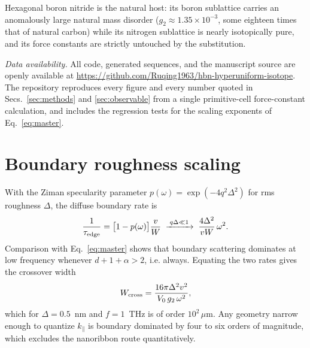 \documentclass[
  aps,
  prl,
  reprint,
  amsmath,
  amssymb,
  superscriptaddress,
  floatfix,
  nofootinbib
]{revtex4-2}
\begin{document}
Hexagonal boron nitride is the natural host: its boron sublattice carries an
anomalously large natural mass disorder ($g_2\approx1.35\times10^{-3}$, some
eighteen times that of natural carbon) while its nitrogen sublattice is nearly
isotopically pure, and its force constants are strictly untouched by the
substitution.

\emph{Data availability.} All code, generated sequences, and the manuscript
source are openly available at
\url{https://github.com/Ruqing1963/hbn-hyperuniform-isotope}. The repository
reproduces every figure and every number quoted in Secs.~\ref{sec:methods} and
\ref{sec:observable} from a single primitive-cell force-constant calculation,
and includes the regression tests for the scaling exponents of
Eq.~\eqref{eq:master}.

\appendix
\section{Boundary roughness scaling}

With the Ziman specularity parameter $p(\omega)=\exp(-4q^{2}\Delta^{2})$ for
rms roughness $\Delta$, the diffuse boundary rate is
\begin{equation}
  \frac{1}{\tau_{\rm edge}}=\big[1-p(\omega)\big]\frac{v}{W}
  \;\xrightarrow{\;q\Delta\ll1\;}\;
  \frac{4\Delta^{2}}{vW}\,\omega^{2}.
  \label{eq:edge}
\end{equation}
Comparison with Eq.~\eqref{eq:master} shows that boundary scattering dominates
at low frequency whenever $d+1+\alpha>2$, i.e. always. Equating the two rates
gives the crossover width
\begin{equation}
  W_{\rm cross}=\frac{16\pi\Delta^{2}v^{2}}{V_0\,g_2\,\omega^{2}},
  \label{eq:wcross}
\end{equation}
which for $\Delta=0.5$~nm and $f=1$~THz is of order $10^{2}\,\mu$m. Any
geometry narrow enough to quantize $k_\parallel$ is boundary dominated by four
to six orders of magnitude, which excludes the nanoribbon route
quantitatively.


\end{document}
